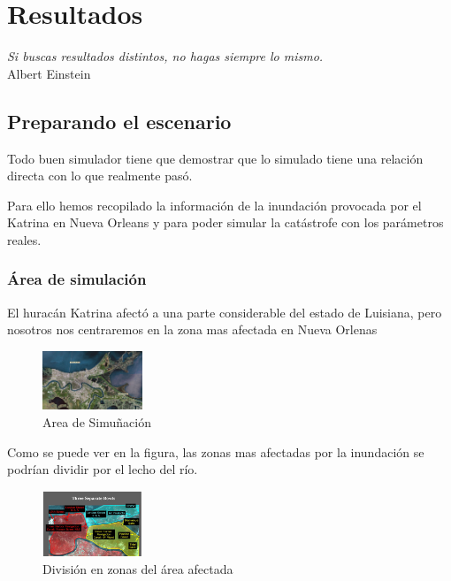 
\chapter*{Resultados} \label{cap6}

\begin{flushright}
\begin{minipage}{7.85cm}
    {\em Si buscas resultados distintos, no hagas siempre lo mismo.} \\ Albert
    Einstein
\end{minipage}
\end{flushright}

\vspace*{5mm}

\section*{Preparando el escenario}
Todo buen simulador tiene que demostrar que lo simulado tiene una relación
directa con lo que realmente pasó.

Para ello hemos recopilado la información de la inundación provocada por el
Katrina en Nueva Orleans y para poder simular la catástrofe con los parámetros
reales.
\subsection*{Área de simulación}
El huracán Katrina afectó a una parte considerable del estado de Luisiana, pero
nosotros nos centraremos en la zona mas afectada en Nueva Orlenas
\begin{figure}[H]
 \centering
 \includegraphics[width=30mm]{figuras/cap6/NOarea1.png}
\caption{Area de Simuñación}
\end{figure}

Como se puede ver en la figura, las zonas mas afectadas por la inundación se
podrían dividir por el lecho del río.
\begin{figure}[H]
 \centering
 \includegraphics[width=30mm]{figuras/cap6/Areas Afectadas.png}
\caption{División en zonas del área afectada}
\end{figure}

